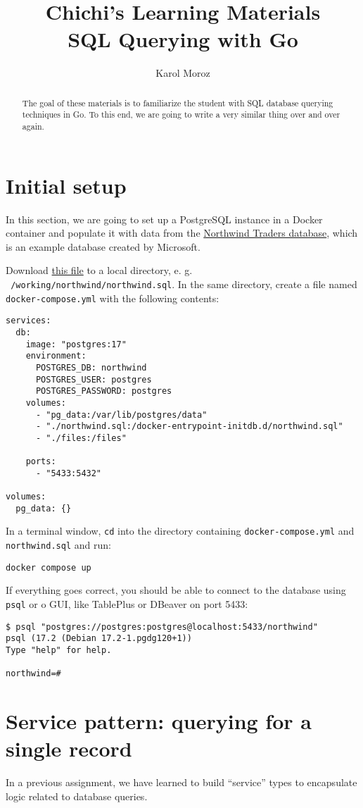 \documentclass[a4paper,12pt]{article}
\title{Chichi's Learning Materials\\ SQL Querying with Go}
\author{Karol Moroz}
\begin{document}
\maketitle

\begin{abstract}
The goal of these materials is to familiarize the student with SQL database querying techniques in Go.
To this end, we are going to write a very similar thing over and over again.
\end{abstract}

\raggedright

\section{Initial setup}

In this section, we are going to set up a PostgreSQL instance in a Docker container and populate it with data from the \href{https://en.wikiversity.org/wiki/Database_Examples/Northwind}{Northwind Traders database}, which is an example database created by Microsoft.

Download \href{https://raw.githubusercontent.com/pthom/northwind_psql/refs/heads/master/northwind.sql}{this file} to a local directory, e. g. \texttt{~/working/northwind/northwind.sql}.
In the same directory, create a file named \texttt{docker-compose.yml} with the following contents:

\begin{verbatim}
services:
  db:
    image: "postgres:17"
    environment:
      POSTGRES_DB: northwind
      POSTGRES_USER: postgres
      POSTGRES_PASSWORD: postgres
    volumes:
      - "pg_data:/var/lib/postgres/data"
      - "./northwind.sql:/docker-entrypoint-initdb.d/northwind.sql"
      - "./files:/files"

    ports:
      - "5433:5432"

volumes:
  pg_data: {}
\end{verbatim}

In a terminal window, \texttt{cd} into the directory containing \texttt{docker-compose.yml} and \texttt{northwind.sql} and run:

\begin{verbatim}
docker compose up
\end{verbatim}

If everything goes correct, you should be able to connect to the database using \texttt{psql} or o GUI, like TablePlus or DBeaver on port 5433:

\begin{verbatim}
$ psql "postgres://postgres:postgres@localhost:5433/northwind"
psql (17.2 (Debian 17.2-1.pgdg120+1))
Type "help" for help.

northwind=# 
\end{verbatim}

\section{Service pattern: querying for a single record}

In a previous assignment, we have learned to build ``service'' types to encapsulate logic related to database queries.
\end{document}
